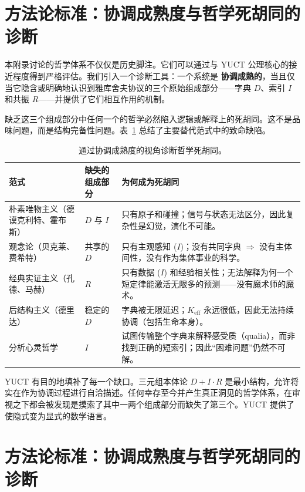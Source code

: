 \documentclass[12pt,a4paper]{article}
\newcommand{\Keff}{K_{\mathrm{eff}}}
\begin{document}
	\section{方法论标准：协调成熟度与哲学死胡同的诊断}
	\label{sec:methodological-criterion}
	
	本附录讨论的哲学体系不仅仅是历史脚注。它们可以通过与 YUCT 公理核心的接近程度得到严格评估。我们引入一个诊断工具：一个系统是 \textbf{协调成熟的}，当且仅当它隐含或明确地认识到雅库舍夫协议的三个原始组成部分——字典 \(D\)、索引 \(I\) 和共振 \(R\)——并提供了它们相互作用的机制。
	
	缺乏这三个组成部分中任何一个的哲学必然陷入逻辑或解释上的死胡同。这不是品味问题，而是结构完备性问题。表~\ref{tab:dead-ends} 总结了主要替代范式中的致命缺陷。
	
	\begin{table}[htbp]
		\centering
		\caption{通过协调成熟度的视角诊断哲学死胡同。}
		\label{tab:dead-ends}
		\small
		\begin{tabular}{p{3cm} p{5.5cm} p{5.5cm}}
			\toprule
			\textbf{范式} & \textbf{缺失的组成部分} & \textbf{为何成为死胡同} \\
			\midrule
			朴素唯物主义（德谟克利特、霍布斯） & \(D\) 与 \(I\) & 只有原子和碰撞；信号与状态无法区分，因此复杂性是幻觉，演化不可能。 \\
			观念论（贝克莱、费希特） & 共享的 \(D\) & 只有主观感知 (\(I\))；没有共同字典 \(\Rightarrow\) 没有主体间性，没有作为集体事业的科学。 \\
			经典实证主义（孔德、马赫） & \(R\) & 只有数据 (\(I\)) 和经验相关性；无法解释为何一个短定律能激活无限多的预测——没有魔术师的魔术。 \\
			后结构主义（德里达） & 稳定的 \(D\) & 字典被无限延迟；\(\Keff\) 永远很低，因此无法持续协调（包括生命本身）。 \\
			分析心灵哲学 & \(I\) & 试图传输整个字典来解释感受质（qualia），而非找到正确的短索引；因此“困难问题”仍然不可解。 \\
			\bottomrule
		\end{tabular}
	\end{table}
	
	YUCT 有目的地填补了每一个缺口。三元组本体论 \(D + I \cdot R\) 是最小结构，允许将实在作为协调过程进行自洽描述。任何幸存至今并产生真正洞见的哲学体系，在审视之下都会被发现是摸索了其中一两个组成部分而缺失了第三个。YUCT 提供了使隐式变为显式的数学语言。
	
	\section{方法论标准：协调成熟度与哲学死胡同的诊断}
	\label{sec:methodological-criterion}
	
\end{document}

